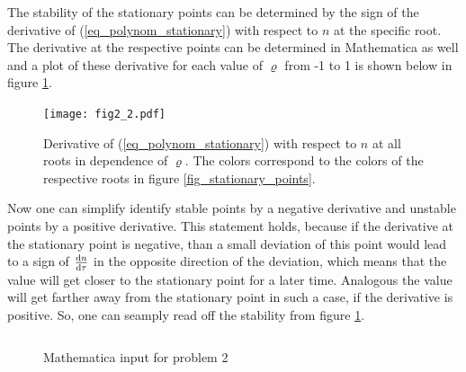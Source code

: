 \documentclass[12pt, a4paper]{article}
\begin{document}
  The stability of the stationary points can be determined by the sign of the derivative of (\ref{eq_polynom_stationary}) with respect to $n$ at the specific root. The derivative at the respective points can be determined in Mathematica as well and a plot of these derivative for each value of $\varrho$ from -1 to 1 is shown below in figure \ref{fig_stationary_points_stability}.

  \begin{figure}
    \centering
    \texttt{[image: fig2\_2.pdf]}
    \caption{Derivative of (\ref{eq_polynom_stationary}) with respect to $n$ at all roots in dependence of $\varrho$. The colors correspond to the colors of the respective roots in figure \ref{fig_stationary_points}.}
    \label{fig_stationary_points_stability}
  \end{figure}

  Now one can simplify identify stable points by a negative derivative and unstable points by a positive derivative. This statement holds, because if the derivative at the stationary point is negative, than a small deviation of this point would lead to a sign of $\frac{{\rm d} n}{{\rm d} \tau}$ \glqq in the opposite direction\grqq{} of the deviation, which means that the value will get closer to the stationary point for a later time. Analogous the value will get farther away from the stationary point in such a case, if the derivative is positive. So, one can seamply read off the stability from figure \ref{fig_stationary_points_stability}.

  \begin{figure}
    \captionsetup{type=listing}
    \inputminted{mathematica}{problem2_code.txt}
    \caption{Mathematica input for problem 2}
  \end{figure}
  
\end{document}
